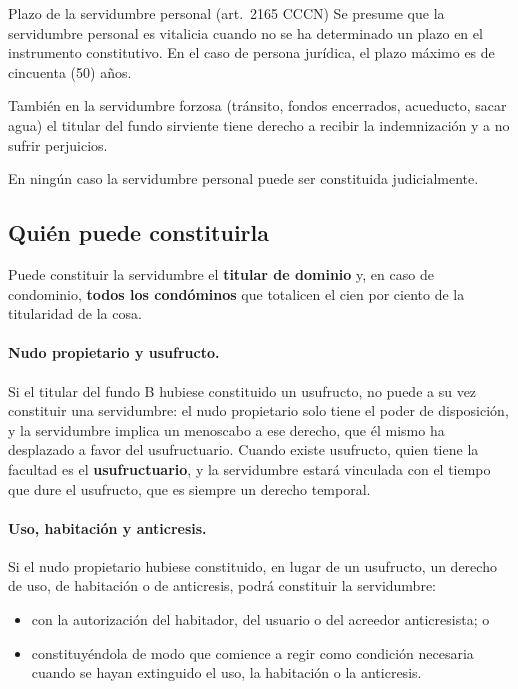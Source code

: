 \documentclass[12pt,oneside]{book}
\begin{document}
\begin{regla}{Plazo de la servidumbre personal (art.~2165 CCCN)}
Se presume que la servidumbre personal es vitalicia cuando no se ha determinado un plazo en el instrumento constitutivo. En el caso de persona jurídica, el plazo máximo es de cincuenta (50) años.
\end{regla}

También en la servidumbre forzosa (tránsito, fondos encerrados, acueducto, sacar agua) el titular del fundo sirviente tiene derecho a recibir la indemnización y a no sufrir perjuicios.

\begin{importante}
En ningún caso la servidumbre personal puede ser constituida judicialmente.
\end{importante}

\subsection{Quién puede constituirla}

Puede constituir la servidumbre el \textbf{titular de dominio} y, en caso de condominio, \textbf{todos los condóminos} que totalicen el cien por ciento de la titularidad de la cosa.

\paragraph{Nudo propietario y usufructo.} Si el titular del fundo B hubiese constituido un usufructo, no puede a su vez constituir una servidumbre: el nudo propietario solo tiene el poder de disposición, y la servidumbre implica un menoscabo a ese derecho, que él mismo ha desplazado a favor del usufructuario. Cuando existe usufructo, quien tiene la facultad es el \textbf{usufructuario}, y la servidumbre estará vinculada con el tiempo que dure el usufructo, que es siempre un derecho temporal.

\paragraph{Uso, habitación y anticresis.} Si el nudo propietario hubiese constituido, en lugar de un usufructo, un derecho de uso, de habitación o de anticresis, podrá constituir la servidumbre:
\begin{itemize}
    \item con la autorización del habitador, del usuario o del acreedor anticresista; o
    \item constituyéndola de modo que comience a regir como condición necesaria cuando se hayan extinguido el uso, la habitación o la anticresis.
\end{itemize}
\end{document}
